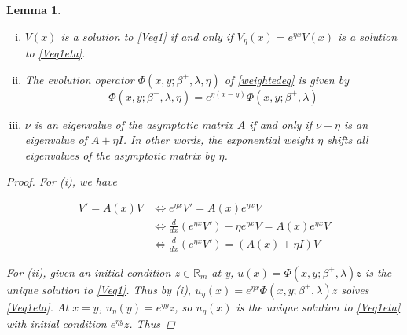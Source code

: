 \documentclass[12pt]{article}
\def\R{{\mathbb R}}
\newtheorem{lemma}{Lemma}
\begin{document}

\begin{lemma}\label{weightfacts}
\begin{enumerate}[(i)]

Let $A(x)$ be a matrix-valued function such that $A(x)$ is exponentially asymptotic to the constant matrix $A$. Consider the eigenvalue problem

\begin{equation}\label{Veq1}
V' = A(x)V
\end{equation}

and the corresponding weighted eigenvalue problem with exponential weight $\eta$

\begin{equation}\label{Veq1eta}
V_\eta' = (A(x) + \eta I)V_\eta
\end{equation}

\item $V(x)$ is a solution to \eqref{Veq1} if and only if $V_\eta(x) = e^{\eta x} V(x)$ is a solution to \eqref{Veq1eta}.

\item The evolution operator $\Phi(x, y; \beta^+, \lambda, \eta)$ of \eqref{weightedeq} is given by
\begin{equation}\label{evolweight}
\Phi(x, y; \beta^+, \lambda, \eta) = e^{\eta(x - y)} \Phi(x, y; \beta^+, \lambda)
\end{equation}

\item $\nu$ is an eigenvalue of the asymptotic matrix $A$ if and only if $\nu + \eta$ is an eigenvalue of $A + \eta I$. In other words, the exponential weight $\eta$ shifts all eigenvalues of the asymptotic matrix by $\eta$.

\end{enumerate}

\begin{proof}

For (i), we have

\begin{align*}
V' = A(x)V &\iff e^{\eta x} V' = A(x) e^{\eta x} V \\
&\iff \frac{d}{dx} (e^{\eta x} V') - \eta e^{\eta x} V = A(x) e^{\eta x} V \\
&\iff \frac{d}{dx} (e^{\eta x} V') = ( A(x) + \eta I)V 
\end{align*}

For (ii), given an initial condition $z \in \R_m$ at y, $u(x) = \Phi(x, y; \beta^+, \lambda) z$ is the unique solution to \eqref{Veq1}. Thus by (i), $u_\eta(x) = e^{\eta x} \Phi(x, y; \beta^+, \lambda) z$ solves \eqref{Veq1eta}. At $x = y$, $u_\eta(y) = e^{\eta y} z$, so $u_\eta(x)$ is the unique solution to \eqref{Veq1eta} with initial condition $e^{\eta y} z$. Thus


\end{proof}
\end{lemma}
\end{document}
